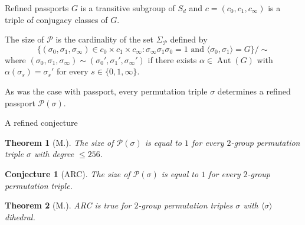 \documentclass[xcolor=dvipsnames,handout]{beamer}
\theoremstyle{plain}
\newtheorem*{thm}{Theorem}
\newtheorem*{conj}{Conjecture}
\DeclareMathOperator{\Aut}{Aut}
\begin{document}
{\begin{frame}{Refined passports}
      $G$ is a transitive subgroup of $S_d$
      and $c = (c_0,c_1,c_\infty)$
      is a triple of conjugacy classes
      of $G$.
      \pause\par
      The size of
      $\mathscr{P}$ is the cardinality of the
      set
      $\Sigma_\mathscr{P}$
      defined by
      \[
        \Big\{
          (\sigma_0,\sigma_1,\sigma_\infty)\in c_0\times c_1\times c_\infty :
          \sigma_\infty\sigma_1\sigma_0=1
          \text{ and }
          \langle\sigma_0,\sigma_1\rangle=G
        \Big\}/\!\!\sim
      \]
      where
      $(\sigma_0,\sigma_1,\sigma_\infty)\sim
      (\sigma_0',\sigma_1',\sigma_\infty')$
      if there exists $\alpha\in\Aut(G)$
      with $\alpha(\sigma_s) = \sigma_s'$ for
      every $s\in\{0,1,\infty\}$.
      \pause\par
      As was the case with passport,
      every permutation triple $\sigma$
      determines a refined passport
      $\mathscr{P}(\sigma)$.
    \end{frame}
    \begin{frame}{A refined conjecture}
      \begin{thm}[M.]
        \vspace{1pt}
        The size of $\mathscr{P}(\sigma)$ is
        equal to $1$ for every
        $2$-group permutation triple
        $\sigma$ with degree $\leq 256$.
      \end{thm}
      \pause\par
      \begin{conj}[ARC]
        \vspace{1pt}
        The size of $\mathscr{P}(\sigma)$ is
        equal to $1$ for every
        $2$-group permutation triple.
      \end{conj}
      \pause\par
      \begin{thm}[M.]
        \vspace{1pt}
        ARC is true for $2$-group permutation triples $\sigma$
        with $\langle\sigma\rangle$ dihedral.
      \end{thm}
    \end{frame}
  }
\end{document}
